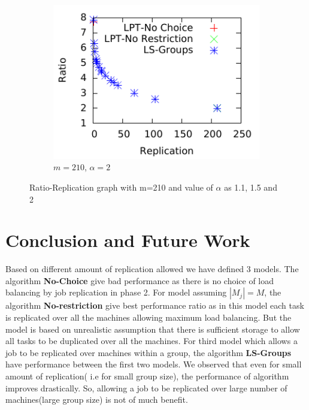 \documentclass[10pt, conference, compsocconf]{IEEEtran}
\begin{document}
\begin {figure}
\begin{subfigure}[b]{0.5\textwidth}
     \includegraphics[width=\textwidth]{alpha_2.pdf}
     \caption{$m=210$, $\alpha=2$}
      \label{fig:3}
\end {subfigure} %


\caption{Ratio-Replication graph with m=210 and value of $\alpha$ as 1.1, 1.5 and 2}
\label{fig:Graph}
\end {figure}

\section{Conclusion and Future Work}

Based on different amount of replication allowed we have defined 3 models.  The algorithm \textbf{No-Choice} give bad performance as there is no choice of load balancing by job replication in phase 2. For model assuming $|M_j|=M$, the algorithm \textbf{No-restriction} give best performance ratio as in this model each task is replicated over all the machines allowing maximum load balancing.  But the model is based on unrealistic assumption that there is sufficient storage to allow all tasks to be duplicated over all the machines. For third model which allows a job to be replicated over machines within a group, the algorithm \textbf{LS-Groups} have performance between the first two models. We observed that even for small amount of replication( i.e for small group size), the performance of algorithm improves drastically. So, allowing a job to be replicated over large number of machines(large group size) is not of much benefit. 
\end{document}
